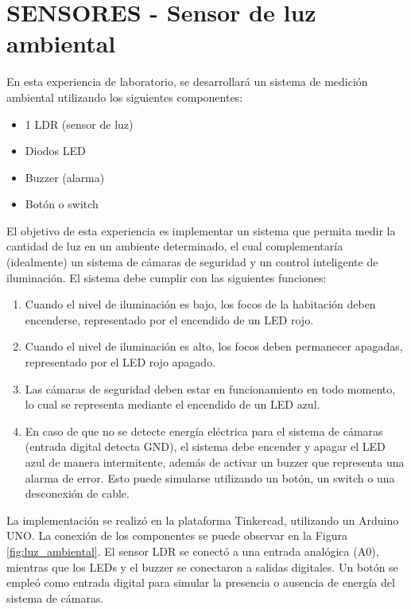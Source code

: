 \section{SENSORES - Sensor de luz ambiental}


En esta experiencia de laboratorio, se desarrollará un sistema de medición ambiental utilizando los siguientes componentes: 
\begin{itemize}
    \item 1 LDR (sensor de luz)
    \item Diodos LED
    \item Buzzer (alarma)
    \item Botón o switch
\end{itemize}

El objetivo de esta experiencia es implementar un sistema que permita medir la cantidad de luz en un ambiente determinado, el cual complementaría (idealmente) un sistema de cámaras de seguridad y un control inteligente de iluminación. El sistema debe cumplir con las siguientes funciones:
\begin{enumerate}
    \item Cuando el nivel de iluminación es bajo, los focos de la habitación deben encenderse, representado por el encendido de un LED rojo.
    \item Cuando el nivel de iluminación es alto, los focos deben permanecer apagadas, representado por el LED rojo apagado.
    \item Las cámaras de seguridad deben estar en funcionamiento en todo momento, lo cual se representa mediante el encendido de un LED azul.
    \item En caso de que no se detecte energía eléctrica para el sistema de cámaras (entrada digital detecta GND), el sistema debe encender y apagar el LED azul de manera intermitente, además de activar un buzzer que representa una alarma de error. Esto puede simularse utilizando un botón, un switch o una desconexión de cable.
\end{enumerate}

La implementación se realizó en la plataforma Tinkercad, utilizando un Arduino UNO. La conexión de los componentes se puede observar en la Figura \ref{fig:luz_ambiental}. El sensor LDR se conectó a una entrada analógica (A0), mientras que los LEDs y el buzzer se conectaron a salidas digitales. Un botón se empleó como entrada digital para simular la presencia o ausencia de energía del sistema de cámaras.

